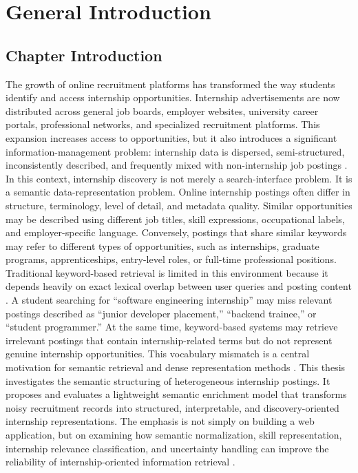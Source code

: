 \chapter{General Introduction}

\section{Chapter Introduction}
The growth of online recruitment platforms has transformed the way students identify and access
internship opportunities. Internship advertisements are now distributed across general job boards,
employer websites, university career portals, professional networks, and specialized recruitment
platforms. This expansion increases access to opportunities, but it also introduces a significant
information-management problem: internship data is dispersed, semi-structured, inconsistently
described, and frequently mixed with non-internship job postings \cite{doan2012principles, batini2009methodologies}.
In this context, internship discovery is not merely a search-interface problem. It is a semantic
data-representation problem. Online internship postings often differ in structure, terminology,
level of detail, and metadata quality. Similar opportunities may be described using different job
titles, skill expressions, occupational labels, and employer-specific language. Conversely,
postings that share similar keywords may refer to different types of opportunities, such as
internships, graduate programs, apprenticeships, entry-level roles, or full-time professional
positions.
Traditional keyword-based retrieval is limited in this environment because it depends heavily on
exact lexical overlap between user queries and posting content \cite{manning2008introduction, robertson2009probabilistic}. A student searching for ``software
engineering internship'' may miss relevant postings described as ``junior developer placement,''
``backend trainee,'' or ``student programmer.'' At the same time, keyword-based systems may
retrieve irrelevant postings that contain internship-related terms but do not represent genuine
internship opportunities. This vocabulary mismatch is a central motivation for semantic retrieval
and dense representation methods \cite{baeza2011modern, luan2021sparse}.
This thesis investigates the semantic structuring of heterogeneous internship postings. It proposes
and evaluates a lightweight semantic enrichment model that transforms noisy recruitment records
into structured, interpretable, and discovery-oriented internship representations. The emphasis is
not simply on building a web application, but on examining how semantic normalization, skill
representation, internship relevance classification, and uncertainty handling can improve the
reliability of internship-oriented information retrieval \cite{sarawagi2008information, li2020survey, shvaiko2013ontology}.

